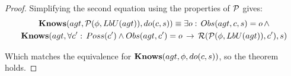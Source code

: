 \begin{proof}
Simplifying the second equation using the properties of $\mathcal{P}$ gives:\begin{multline*}
\mathbf{Knows}(agt,\mathcal{P}(\phi,LbU(agt)),do(c,s))\equiv\exists o:\, Obs(agt,c,s)=o\,\wedge\\
\mathbf{Knows}(agt,\forall c':\, Poss(c')\wedge Obs(agt,c')=o\,\rightarrow\,\mathcal{R}(\mathcal{P}(\phi,LbU(agt)),c'),s)\end{multline*}


Which matches the equivalence for $\mathbf{Knows}(agt,\phi,do(c,s))$, so
the theorem holds.
\end{proof}
\medskip{}




